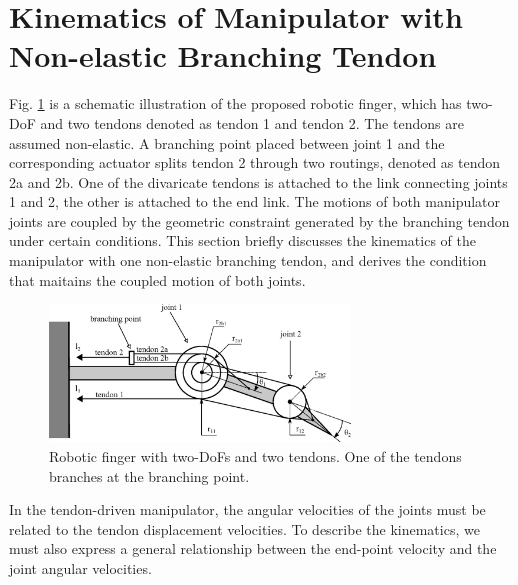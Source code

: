 \documentclass{llncs}
\begin{document}
\section{Kinematics of Manipulator with Non-elastic Branching Tendon}
Fig. \ref{branching_model} is a schematic illustration of the proposed robotic finger,
which 
has two-DoF and two tendons denoted as tendon 1 and tendon 2.
The tendons are assumed non-elastic.
A branching point placed between joint 1 and the corresponding actuator splits tendon 2 through two routings,
denoted as tendon 2a and 2b.
One of the divaricate tendons is attached to the link connecting joints 1 and 2, the other is attached to the end link.
The motions of both manipulator joints are coupled by the geometric constraint generated by the branching tendon under certain conditions.
This section briefly discusses the kinematics of the manipulator with one non-elastic branching tendon,
and derives the condition that maitains the coupled motion of both joints.
\begin{figure}[t]
	\centering
	\includegraphics[width=80mm]{fig/coupled.eps}
	\caption{Robotic finger with two-DoFs and two tendons. One of the tendons branches at the branching point.}
	\label{branching_model}
\end{figure}
In the tendon-driven manipulator, the angular velocities of the joints must be related to the tendon displacement velocities.
To describe the kinematics, we must also express a general relationship between the end-point velocity and the joint angular velocities.
\end{document}
